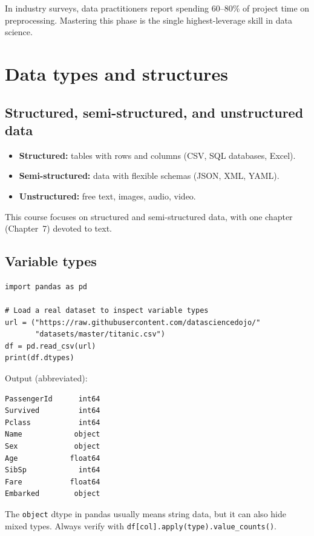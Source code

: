 \begin{datatip}
In industry surveys, data practitioners report spending 60--80\% of project time on preprocessing. Mastering this phase is the single highest-leverage skill in data science.
\end{datatip}

\section{Data types and structures}

\subsection{Structured, semi-structured, and unstructured data}

\begin{itemize}
  \item \textbf{Structured:} tables with rows and columns (CSV, SQL databases, Excel).
  \item \textbf{Semi-structured:} data with flexible schemas (JSON, XML, YAML).
  \item \textbf{Unstructured:} free text, images, audio, video.
\end{itemize}

This course focuses on structured and semi-structured data, with one chapter (Chapter~7) devoted to text.

\subsection{Variable types}

\begin{verbatim}
import pandas as pd

# Load a real dataset to inspect variable types
url = ("https://raw.githubusercontent.com/datasciencedojo/"
       "datasets/master/titanic.csv")
df = pd.read_csv(url)
print(df.dtypes)
\end{verbatim}

Output (abbreviated):
\begin{verbatim}
PassengerId      int64
Survived         int64
Pclass           int64
Name            object
Sex             object
Age            float64
SibSp            int64
Fare           float64
Embarked        object
\end{verbatim}

\begin{preprocesstip}
The \texttt{object} dtype in pandas usually means string data, but it can also hide mixed types. Always verify with \texttt{df[col].apply(type).value\_counts()}.
\end{preprocesstip}

